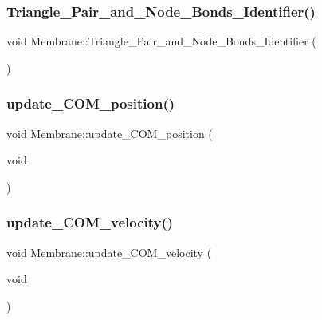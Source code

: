 \subsubsection{\texorpdfstring{Triangle\_Pair\_and\_Node\_Bonds\_Identifier()}{Triangle\_Pair\_and\_Node\_Bonds\_Identifier()}}
{\footnotesize\ttfamily void Membrane\+::\+Triangle\+\_\+\+Pair\+\_\+and\+\_\+\+Node\+\_\+\+Bonds\+\_\+\+Identifier (\begin{DoxyParamCaption}{ }\end{DoxyParamCaption})}

\mbox{\label{classMembrane_ad7368b7721d9279f54a7dece975ee152}} 
\subsubsection{\texorpdfstring{update\_COM\_position()}{update\_COM\_position()}}
{\footnotesize\ttfamily void Membrane\+::update\+\_\+\+C\+O\+M\+\_\+position (\begin{DoxyParamCaption}\item[{void}]{ }\end{DoxyParamCaption})\hspace{0.3cm}{\ttfamily [inline]}}

\mbox{\label{classMembrane_aa1bb3ec5f5b6c6451e2f72103fbdde08}} 
\subsubsection{\texorpdfstring{update\_COM\_velocity()}{update\_COM\_velocity()}}
{\footnotesize\ttfamily void Membrane\+::update\+\_\+\+C\+O\+M\+\_\+velocity (\begin{DoxyParamCaption}\item[{void}]{ }\end{DoxyParamCaption})\hspace{0.3cm}{\ttfamily [inline]}}

\mbox{\label{classMembrane_a1cf1d4947d79a4529239f292534b9e19}} 
